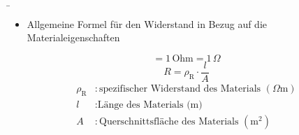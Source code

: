 \begin{frame}
	\b{
		
		\begin{itemize}
		\item Allgemeine Formel für den Widerstand in Bezug auf die Materialeigenschaften
	    \end{itemize}
		\vspace{1cm}
		\begin{equation*}
			[R] = 1\, \text{Ohm} = 1\, \text{$\Omega$}
		\end{equation*}
		\vspace{0.1cm}
		\begin{equation*}
			R = \rho_\mathrm{R} \cdot \frac{l}{A} 
		\end{equation*}
		\begin{align*}
			\rho_\mathrm{R} &: \text{spezifischer Widerstand des Materials } (\Omega \text{m}) \\
			l &: \text{Länge des Materials (m)} \\
			A &: \text{Querschnittsfläche des Materials } (\text{m}^2) \\
		\end{align*}

}
\end{frame}
